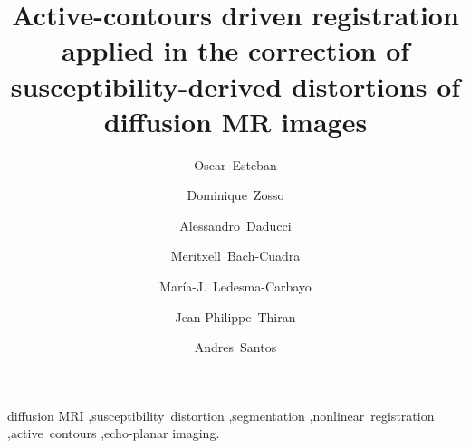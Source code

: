 \documentclass[5p,authoryear]{elsarticle}
\begin{document}
\begin{frontmatter}


\title{Active-contours driven registration applied in the correction of
susceptibility-derived distortions of diffusion MR images}

\author[bit,ciber]{Oscar~Esteban}
\author[ucla]{Dominique~Zosso}
\author[scil,lts5]{Alessandro~Daducci}
\author[chuv,lts5]{Meritxell~Bach-Cuadra}
\author[bit,ciber]{Mar\'ia-J.~Ledesma-Carbayo}
\author[lts5]{Jean-Philippe~Thiran}
\author[bit,ciber]{Andres~Santos}


\address[bit]{Biomedical Image Technologies (BIT), ETSI Telecomunicaci\'on, %
Universidad Polit\'ecnica de Madrid, Madrid, Spain}
\address[ciber]{Centro de Investigaci\'on Biom\'edica en Red en Bioingenier\'ia, Biomateriales y Nanomedicina (CIBER-BBN), Zaragoza, Spain}
\address[ucla]{Department of Mathematics, University of California,
Los Angeles (UCLA), Los Angeles, CA, US}
\address[scil]{Computer Science Department, Faculty of Science, Universit\'e de Sherbrooke, 2500 Boulevard Universit\'e, Sherbrooke, QC J1K 2R1, Canada}
\address[lts5]{Signal Processing Laboratory (LTS5), \'Ecole Polytechnique
F\'ed\'erale de Lausanne (EPFL), Lausanne, Switzerland}
\address[chuv]{Dept. of Radiology, University
Hospital Center (CHUV) and University of Lausanne (UNIL), Lausanne, Switzerland}

\begin{abstract}

\end{abstract}

\begin{keyword}
diffusion MRI \sep susceptibility~distortion \sep segmentation %
\sep nonlinear~registration \sep active~contours \sep echo-planar imaging.
\end{keyword}

\end{frontmatter}

\linenumbers










%



\appendix
{}

\end{document}
